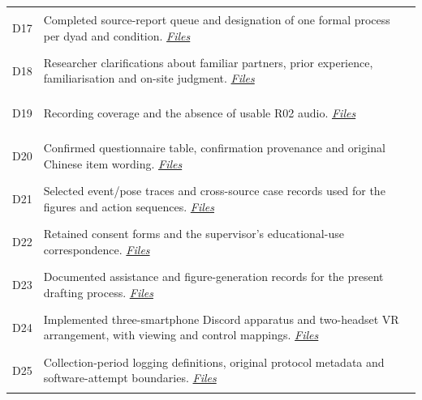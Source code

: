 \begin{longtable}{@{}p{14mm}>{\raggedright\arraybackslash}p{140mm}@{}}
\hypertarget{src:D17}{}\label{src:D17}D17 & Completed source-report queue and designation of one formal process per dyad and condition. \href{https://github.com/YiyangQin-UQ/REIT7841/blob/main/thesis/v1.1/materials/README.md\#d17}{\textit{Files}} \\
\hypertarget{src:D18}{}\label{src:D18}D18 & Researcher clarifications about familiar partners, prior experience, familiarisation and on-site judgment. \href{https://github.com/YiyangQin-UQ/REIT7841/blob/main/thesis/v1.1/materials/README.md\#d18}{\textit{Files}} \\
\hypertarget{src:D19}{}\label{src:D19}D19 & Recording coverage and the absence of usable R02 audio. \href{https://github.com/YiyangQin-UQ/REIT7841/blob/main/thesis/v1.1/materials/README.md\#d19}{\textit{Files}} \\
\hypertarget{src:D20}{}\label{src:D20}D20 & Confirmed questionnaire table, confirmation provenance and original Chinese item wording. \href{https://github.com/YiyangQin-UQ/REIT7841/blob/main/thesis/v1.1/materials/README.md\#d20}{\textit{Files}} \\
\hypertarget{src:D21}{}\label{src:D21}D21 & Selected event/pose traces and cross-source case records used for the figures and action sequences. \href{https://github.com/YiyangQin-UQ/REIT7841/blob/main/thesis/v1.1/materials/README.md\#d21}{\textit{Files}} \\
\hypertarget{src:D22}{}\label{src:D22}D22 & Retained consent forms and the supervisor's educational-use correspondence. \href{https://github.com/YiyangQin-UQ/REIT7841/blob/main/thesis/v1.1/materials/README.md\#d22}{\textit{Files}} \\
\hypertarget{src:D23}{}\label{src:D23}D23 & Documented assistance and figure-generation records for the present drafting process. \href{https://github.com/YiyangQin-UQ/REIT7841/blob/main/thesis/v1.1/materials/README.md\#d23}{\textit{Files}} \\
\hypertarget{src:D24}{}\label{src:D24}D24 & Implemented three-smartphone Discord apparatus and two-headset VR arrangement, with viewing and control mappings. \href{https://github.com/YiyangQin-UQ/REIT7841/blob/main/thesis/v1.1/materials/README.md\#d24}{\textit{Files}} \\
\hypertarget{src:D25}{}\label{src:D25}D25 & Collection-period logging definitions, original protocol metadata and software-attempt boundaries. \href{https://github.com/YiyangQin-UQ/REIT7841/blob/main/thesis/v1.1/materials/README.md\#d25}{\textit{Files}} \\

\end{longtable}
